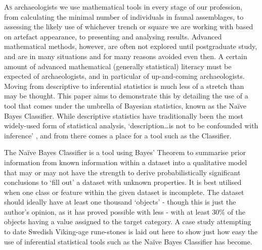 \lettrine[nindent=0em,lines=3]{A}{s} archaeologists we use mathematical tools in every stage of our profession, from calculating the minimal number of individuals in faunal assemblages, to assessing the likely use of whichever trench or square we are working with based on artefact appearance, to presenting and analysing results. Advanced mathematical methods, however, are often not explored until postgraduate study, and are in many situations and for many reasons avoided even then. A certain amount of advanced mathematical (generally statistical) literacy must be expected of archaeologists, and in particular of up-and-coming archaeologists. Moving from descriptive to inferential statistics is much less of a stretch than may be thought. This paper aims to demonstrate this by detailing the use of a tool that comes under the umbrella of Bayesian statistics, known as the Naïve Bayes Classifier. While descriptive statistics have traditionally been the most widely-used form of statistical analysis, ‘description…is not to be confounded with inference’ \parencite[5]{Buck_1996}, and from there comes a place for a tool such as the Classifier. 

	The Naïve Bayes Classifier is a tool using Bayes’ Theorem to summarise prior information from known information within a dataset into a qualitative model that may or may not have the strength to derive probabilistically significant conclusions to ‘fill out’ a dataset with unknown properties. It is best utilised when one class or feature within the given dataset is incomplete. The dataset should ideally have at least one thousand ‘objects’ - though this is just the author’s opinion, as it has proved possible with less - with at least 30\% of the objects having a value assigned to the target category. A case study attempting to date Swedish Viking-age rune-stones is laid out here to show just how easy the use of inferential statistical tools such as the Naïve Bayes Classifier has become. 

	
